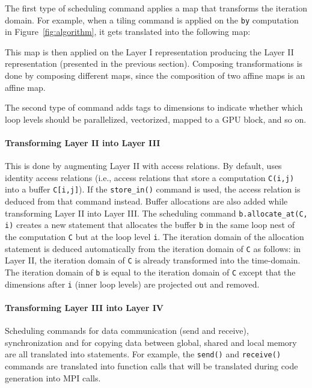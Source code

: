 The first type of scheduling command applies a map that transforms the iteration domain.  For example, when a tiling command is applied on the \texttt{by} computation in Figure~\ref{fig:algorithm}, it gets translated into the following map:

\centerline{}
\centerline{}

This map is then applied on the Layer I representation producing the Layer II representation (presented in the previous section). Composing transformations is done by composing different maps, since the composition of two affine maps is an affine map.

The second type of command adds \processor tags to dimensions to indicate whether which loop levels should be parallelized, vectorized, mapped to a GPU block, and so on.

\vspace{-0.25cm}
\paragraph{Transforming Layer II into Layer III}
This is done by augmenting Layer II with access relations.  By default, \framework{} uses identity access relations (i.e., access relations that store a computation \texttt{C(i,j)} into a buffer \texttt{C[i,j]}).  If the \texttt{store\_in()} command is used, the access relation is deduced from that command instead.  Buffer allocations are also added while transforming Layer II into Layer III. The scheduling command \texttt{b.allocate\_at(C, i)} creates a new statement that allocates the buffer \texttt{b} in the same loop nest of the computation \texttt{C} but at the loop level \texttt{i}.
The iteration domain of the allocation statement is deduced automatically from the iteration domain of \texttt{C} as follows: in Layer II, the iteration domain of \texttt{C} is already transformed into the time-\processor domain.  The iteration domain of \texttt{b} is equal to the iteration domain of \texttt{C} except that the dimensions after \texttt{i} (inner loop levels) are projected out and removed.

\vspace{-0.25cm}
\paragraph{Transforming Layer III into Layer IV}
Scheduling commands for data communication (send and receive), synchronization and for copying data between global, shared and local memory are all translated into statements.  For example, the \texttt{send()} and \texttt{receive()} commands are translated into function calls that will be translated during code generation into MPI calls.

